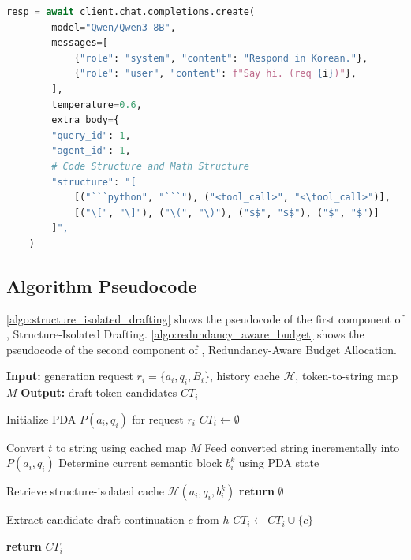 \begin{lstlisting}[language=Python, caption={Example of API request command when using \sysname in vLLM}, label={lst:redundancy}]
resp = await client.chat.completions.create(
        model="Qwen/Qwen3-8B",
        messages=[
            {"role": "system", "content": "Respond in Korean."},
            {"role": "user", "content": f"Say hi. (req {i})"},
        ],
        temperature=0.6,
        extra_body={
        "query_id": 1,
        "agent_id": 1,
        # Code Structure and Math Structure
        "structure": "[
            [("```python", "```"), ("<tool_call>", "<\tool_call>")],
            [("\[", "\]"), ("\(", "\)"), ("$$", "$$"), ("$", "$")]
        ]",
    )
\end{lstlisting}


\begin{table}[ht]
    \centering
    \begin{minipage}{.46\textwidth}
        \GPUTable
    \end{minipage}%
\end{table}

\subsection{Algorithm Pseudocode}
\cref{algo:structure_isolated_drafting} shows the pseudocode of the first component of \sysname, Structure-Isolated Drafting. \cref{algo:redundancy_aware_budget} shows the pseudocode of the second component of \sysname, Redundancy-Aware Budget Allocation.
\begin{algorithm}[ht]
\caption{Structure-Isolated Drafting}
\label{algo:structure_isolated_drafting}
\begin{algorithmic}[1]
    \STATE \textbf{Input:} generation request $r_i = \{a_i, q_i, B_i\}$, history cache $\mathcal{H}$, token-to-string map $M$
    \STATE \textbf{Output:} draft token candidates $CT_i$
    
    \STATE Initialize PDA $P(a_i, q_i)$ for request $r_i$
    \STATE $CT_i \gets \emptyset$
    
        \STATE Convert $t$ to string using cached map $M$
        \STATE Feed converted string incrementally into $P(a_i, q_i)$
        \STATE Determine current semantic block $b_i^k$ using PDA state
    \ENDFOR
    
    \STATE Retrieve structure-isolated cache $\mathcal{H}(a_i, q_i, b_i^k)$
        \STATE \textbf{return} $\emptyset$
    \ENDIF
    
        \STATE Extract candidate draft continuation $c$ from $h$
        \STATE $CT_i \gets CT_i \cup \{c\}$
    \ENDFOR
    
    \STATE \textbf{return} $CT_i$
\end{algorithmic}
\end{algorithm}

